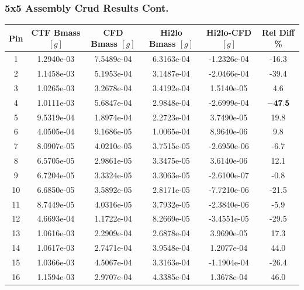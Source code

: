 \documentclass[t, pdftex]{beamer}
\begin{document}
\begin{frame}
\frametitle{5x5 Assembly Crud Results Cont.}
\vspace{-8pt}
\begin{table}[h]
    \tiny
    \begin{center}
        \begin{tabular}[h]{|c|c|c|c|c|c|}
            \hline
            Pin & CTF Bmass $[g]$ & CFD Bmass $[g]$ & Hi2lo Bmass $[g]$ & Hi2lo-CFD $[g]$ & Rel Diff \% \\
            \hline
            1  & 1.2940e-03 & 7.5489e-04 & 6.3163e-04 & -1.2326e-04 &  -16.3 \\
            2  & 1.1458e-03 & 5.1953e-04 & 3.1487e-04 & -2.0466e-04 &  -39.4 \\
            3  & 1.0265e-03 & 3.2678e-04 & 3.4192e-04 & 1.5140e-05 &  4.6 \\ 
            4  & 1.0111e-03 & 5.6847e-04 & 2.9848e-04 & -2.6999e-04 &  $\bf{-47.5}$ \\
            5  & 9.5319e-04 & 1.8974e-04 & 2.2723e-04 & 3.7490e-05 &  19.8 \\ 
            6  & 4.0505e-04 & 9.1686e-05 & 1.0065e-04 & 8.9640e-06 &  9.8 \\ 
            7  & 8.0907e-05 & 4.0210e-05 & 3.7515e-05 & -2.6950e-06 &  -6.7 \\
            8  & 6.5705e-05 & 2.9861e-05 & 3.3475e-05 & 3.6140e-06 &  12.1 \\ 
            9  & 6.7204e-05 & 3.3324e-05 & 3.3063e-05 & -2.6100e-07 &  -0.8 \\
            10  &6.6850e-05 & 3.5892e-05 & 2.8171e-05 & -7.7210e-06 &  -21.5 \\
            11  &8.7449e-05 & 4.0316e-05 & 3.7932e-05 & -2.3840e-06 &  -5.9 \\
            12  &4.6693e-04 & 1.1722e-04 & 8.2669e-05 & -3.4551e-05 &  -29.5 \\
            13  &1.0616e-03 & 2.2909e-04 & 2.6878e-04 & 3.9690e-05 &  17.3 \\ 
            14  &1.0617e-03 & 2.7471e-04 & 3.9548e-04 & 1.2077e-04 &  44.0 \\ 
            15  &1.0366e-03 & 4.5067e-04 & 3.3163e-04 & -1.1904e-04 &  -26.4 \\
            16  &1.1594e-03 & 2.9707e-04 & 4.3385e-04 & 1.3678e-04 &  46.0 \\ 

\end{tabular}
\end{center}
\end{table}
\end{frame}
\end{document}

